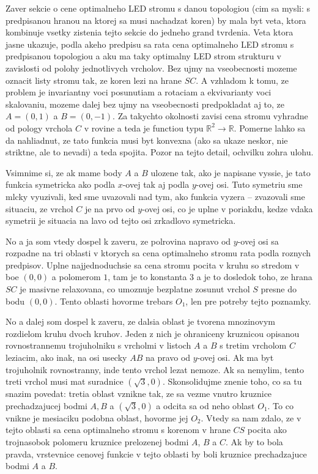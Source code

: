 \documentclass[12pt]{book}
\begin{document}
Zaver sekcie o cene optimalneho LED stromu s danou topologiou (cim sa mysli: s
    predpisanou hranou na ktorej sa musi nachadzat koren) by mala byt veta,
    ktora kombinuje vsetky zistenia tejto sekcie do jedneho grand tvrdenia.
Veta ktora jasne ukazuje, podla akeho predpisu sa rata cena optimalneho LED
    stromu s predpisanou topologiou a aku ma taky optimalny LED strom strukturu
    v zavislosti od polohy jednotlivych vrcholov.
Bez ujmy na vseobecnosti mozeme oznacit listy stromu tak, ze koren lezi na
    hrane $SC$.
A vzhladom k tomu, ze problem je invariantny voci posunutiam a rotaciam a 
    ekvivarianty voci skalovaniu, mozeme dalej bez ujmy na vseobecnosti
    predpokladat aj to, ze $A=(0,1)$ a $B=(0,-1)$.
Za takychto okolnosti zavisi cena stromu vyhradne od pology vrchola $C$ v
    rovine a teda je functiou typu $\mathbb{R}^{2}\to\mathbb{R}$.
Pomerne lahko sa da nahliadnut, ze tato funkcia musi byt konvexna (ako sa ukaze
    neskor, nie striktne, ale to nevadi) a teda spojita.
Pozor na tejto detail, ochvilku zohra ulohu.

Vsimnime si, ze ak mame body $A$ a $B$ ulozene tak, ako je napisane vyssie,
    je tato funkcia symetricka ako podla $x$-ovej tak aj podla $y$-ovej osi.
Tuto symetriu sme mlcky vyuzivali, ked sme uvazovali nad tym, ako funkcia
    vyzera -- zvazovali sme situaciu, ze vrchol $C$ je na prvo od $y$-ovej
    osi, co je uplne v poriakdu, kedze vdaka symetrii je situacia na lavo
    od tejto osi zrkadlovo symetricka.

No a ja som vtedy dospel k zaveru, ze polrovina napravo od $y$-ovej osi sa
    rozpadne na tri oblasti v ktorych sa cena optimalneho stromu rata
    podla roznych predpisov.
Uplne najjednoduchsie sa cena stromu pocita v kruhu so stredom v boe $(0,0)$
    a polomerom $1$, tam je to konstanta $3$ a je to dosledok toho, ze hrana
    $SC$ je masivne relaxovana, co umoznuje bezplatne zosunut vrchol $S$ presne
    do bodu $(0,0)$.
Tento oblasti hovorme trebars $O_{1}$, len pre potreby tejto poznamky.

No a dalej som dospel k zaveru, ze dalsia oblast je tvorena mnozinovym
    rozdielom kruhu dvoch kruhov.
Jeden z nich je ohraniceny kruznicou opisanou rovnostrannemu trojuholniku s
    vrcholmi v listoch $A$ a $B$ s tretim vrcholom $C$ leziacim, ako inak,
    na osi usecky $AB$ na pravo od $y$-ovej osi.
Ak ma byt trojuholnik rovnostranny, inde tento vrchol lezat nemoze.
Ak sa nemylim, tento treti vrchol musi mat suradnice $(\sqrt{3},0)$.
Skonsolidujme znenie toho, co sa tu snazim povedat: tretia oblast vznikne tak,
    ze sa vezme vnutro kruznice prechadzajucej bodmi $A,B$ a $(\sqrt{3},0)$
    a odcita sa od neho oblast $O_{1}$.
To co vnikne je mesiaciku podobna oblast, hovorme jej $O_{2}$.
Vtedy sa nam zdalo, ze v tejto oblasti sa cena optimalneho stromu s korenom
    v hrane $CS$ pocita ako trojnasobok polomeru kruznice prelozenej bodmi
    $A$, $B$ a $C$.
Ak by to bola pravda, vrstevnice cenovej funkcie v tejto oblasti by boli
    kruznice prechadzajuce bodmi $A$ a $B$.
\end{document}
